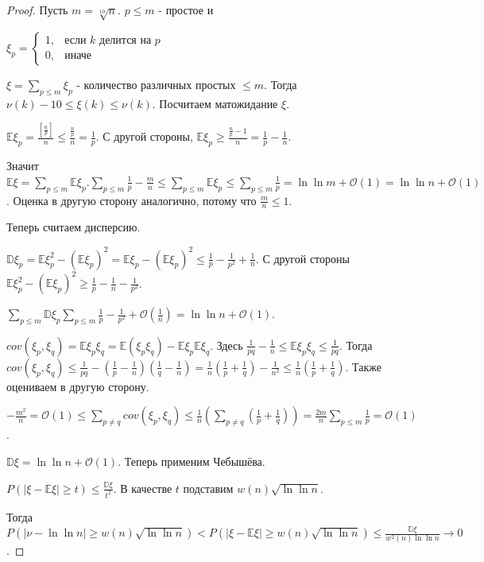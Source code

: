 \begin{proof}
    Пусть $m = \sqrt[10]{n}$. $p \leqslant m$ - простое и

    $
    \xi_p = 
    \begin{cases}
        1, & \text{если $k$ делится на $p$} \\
        0, & \text{иначе}
    \end{cases}
    $

    $\xi = \sum_{p \leqslant m} \xi_p$ - количество различных простых $\leqslant m$. Тогда
    $\nu(k) - 10 \leqslant \xi (k) \leqslant \nu (k)$. Посчитаем матожидание $\xi$.

    $\mathbb{E} \xi_p = \frac{[\frac{n}{p}]}{n} \leqslant \frac{\frac{n}{p}}{n} = \frac{1}{p}$. С другой стороны,
    $\mathbb{E} \xi_p \geqslant \frac{\frac{n}{p} - 1}{n} = \frac{1}{p} - \frac{1}{n}$.

    Значит $\mathbb{E}\xi = \sum_{p \leqslant m} \mathbb{E}\xi_p. \sum_{p \leqslant m} \frac{1}{p} - \frac{m}{n} \leqslant
    \sum_{p \leqslant m} \mathbb{E}\xi_p \leqslant \sum_{p \leqslant m} \frac{1}{p} = \ln \ln m + \mathcal{O}(1) =
    \ln \ln n + \mathcal{O}(1)$. Оценка в другую сторону аналогично, потому что $\frac{m}{n} \leqslant 1$.

    Теперь считаем дисперсию.

    $\mathbb{D}\xi_p = \mathbb{E}\xi_p^2 - (\mathbb{E}\xi_p)^2 = \mathbb{E}\xi_p - (\mathbb{E}\xi_p)^2 \leqslant \frac{1}{p} - \frac{1}{p^2} + \frac{1}{n}$.
    С другой стороны $\mathbb{E}\xi_p^2 - (\mathbb{E}\xi_p)^2 \geqslant \frac{1}{p} - \frac{1}{n} - \frac{1}{p^2}$.

    $\sum_{p \leqslant m} \mathbb{D} \xi_p \sum_{p \leqslant m} \frac{1}{p} - \frac{1}{p^2} + \mathcal{O}(\frac{1}{n}) = \ln \ln n + \mathcal{O}(1)$.

    $cov(\xi_p, \xi_q) = \mathbb{E}\xi_p \xi_q = \mathbb{E} (\xi_p \xi_q) - \mathbb{E} \xi_p \mathbb{E}\xi_q$. Здесь 
    $\frac{1}{pq} - \frac{1}{n} \leqslant \mathbb{E} \xi_p \xi_q \leqslant \frac{1}{pq}$. Тогда $cov(\xi_p, \xi_q) \leqslant
    \frac{1}{pq} - (\frac{1}{p} - \frac{1}{n})(\frac{1}{q} - \frac{1}{n}) = \frac{1}{n}(\frac{1}{p} + \frac{1}{q}) - \frac{1}{n^2} \leqslant \frac{1}{n}(\frac{1}{p} + \frac{1}{q})$.
    Также оцениваем в другую сторону.

    $-\frac{m^2}{n} = \mathcal{O}(1) \leqslant \sum_{p \neq q} cov (\xi_p, \xi_q) \leqslant \frac{1}{n}(\sum_{p \neq q} (\frac{1}{p} + \frac{1}{q})) = 
    \frac{2m}{n} \sum_{p \leqslant m} \frac{1}{p} = \mathcal{O}(1)$.

    $\mathbb{D}\xi = \ln \ln n + \mathcal{O}(1)$. Теперь применим Чебышёва.

    $P(|\xi - \mathbb{E} \xi| \geqslant t) \leqslant \frac{\mathbb{D}\xi}{t^2}$. В качестве $t$ подставим $w(n) \sqrt{\ln \ln n}$.

    Тогда $P (|\nu - \ln \ln n| \geqslant w(n) \sqrt{\ln \ln n}) < P(|\xi - \mathbb{E} \xi| \geqslant w(n) \sqrt{\ln \ln n}) \leqslant \frac{\mathbb{D}\xi}{w^2(n) \ln \ln n} \to 0$.

\end{proof}

